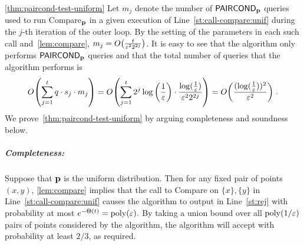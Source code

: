 \begin{proofof}{\cref{thm:paircond-test-uniform}} Let $m_j$ denote the number of ${\sf PAIRCOND}_{\mathbf{p}}$ queries used to run {\sc Compare$_{\mathbf{p}}$} in a given execution
of Line~\ref{st:call-compare:unif} during the $j$-th iteration of the outer
loop. By the setting of the parameters in each such
call and~\cref{lem:compare},
$m_j = \bigO{ \frac{t}{\eps^2  2^{2j}} }$.
It is easy to see that the algorithm only performs ${\sf PAIRCOND}_{\mathbf{p}}$ queries
and that
the total number of queries that the algorithm performs is
\[
  \bigO{ \sum_{j=1}^t q\cdot s_j \cdot m_j }
      = \bigO{ \sum_{j=1}^t 2^j\log\left(\frac{1}{\eps}\right) \cdot \frac{\log(\frac{1}{\eps})}{\eps^2  2^{2j}} }
      = \bigO{ \frac{(\log(\frac{1}{\eps}))^2}{\eps^2} }\;.
\]
We prove~\cref{thm:paircond-test-uniform} by arguing completeness and
soundness below.



\subparagraph{Completeness:}  Suppose that $\mathbf{p}$ is the uniform
distribution. Then for any fixed pair of points $(x,y)$,
\cref{lem:compare} implies that the call to {\sc Compare}
on $\{x\},\{y\}$ in Line~\ref{st:call-compare:unif} causes the algorithm
to output \reject in Line~\ref{st:rej} with probability
at most $e^{-\Theta(t)}=
\operatorname*{poly}(\varepsilon).$
By taking a union bound over all $\operatorname*{poly}(1/\varepsilon)$ pairs of points considered
by the algorithm, the algorithm will accept with probability at least
$2/3$, as required.

\medskip


\end{proofof}
